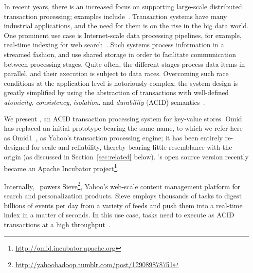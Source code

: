 
In recent years, there is an increased focus on supporting large-scale distributed transaction processing;
examples include~\cite{Tephra,Aguilera2015,Balakrishnan2013,Spanner2012,Cowling2012,Dragojevic2015,Kraska2013}.
Transaction systems have many industrial applications, and the need for them is on the rise in the big data world. 
One prominent use case is Internet-scale data processing pipelines, for example, real-time indexing for 
web search~\cite{Percolator2010}. Such systems process information in a streamed fashion, and use shared storage 
in order to facilitate communication between processing stages. Quite often, the different stages process  
data items in parallel, and their execution is subject to data races. Overcoming such race conditions at the application 
level is notoriously complex; the system design is greatly simplified by using the abstraction of transactions with 
well-defined {\em atomicity}, {\em consistency}, {\em isolation}, and {\em durability} (ACID) semantics~\cite{Gray:1992:TPC:573304}. 

We present \sys, an ACID transaction processing system for key-value stores. 
Omid has replaced an initial prototype bearing the same name, 
to which we refer here as Omid1~\cite{OmidICDE2014}, as Yahoo's transaction processing engine; 
it has  been entirely re-designed for scale and reliability, thereby bearing little resemblance with the origin (as discussed 
in Section~\ref{sec:related} below). 
\sys's open source version  recently became an Apache Incubator project\footnote{\url{http://omid.incubator.apache.org}}. 
  
Internally, \sys\ powers Sieve\footnote{\url{http://yahoohadoop.tumblr.com/post/129089878751}}, 
Yahoo's web-scale content management platform for search and personalization products. Sieve
employs thousands of tasks to digest billions of events per day from a variety of feeds
and push them into a real-time index in a matter of seconds. In this use case, 
tasks need to execute as ACID transactions at a high throughput~\cite{Percolator2010}. 


